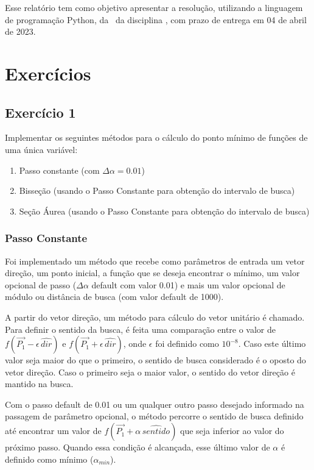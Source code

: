\documentclass[10pt, a4paper]{article}
\begin{document}
Esse relatório tem como objetivo apresentar a resolução, utilizando a linguagem de programação Python, da \TITLE \ da disciplina \DISCIPLINE, com prazo de entrega em 04 de abril de 2023.

\section{Exercícios}

\subsection{Exercício 1}

Implementar os seguintes métodos para o cálculo do ponto mínimo de funções de uma única variável:
\begin{enumerate}
  \item Passo constante (com $\Delta \alpha = 0.01$)
  \item Bisseção (usando o Passo Constante para obtenção do intervalo de busca)
  \item Seção Áurea (usando o Passo Constante para obtenção do intervalo de busca)
\end{enumerate}

\subsubsection{Passo Constante}

Foi implementado um método que recebe como parâmetros de entrada um vetor direção, um ponto inicial, 
a função que se deseja encontrar o mínimo, um valor opcional de passo ($\Delta\alpha$ default com valor 0.01)
e mais um valor opcional de módulo ou distância de busca (com valor default de 1000).

A partir do vetor direção, um método para cálculo do vetor unitário é chamado. Para definir o sentido da busca,
é feita uma comparação entre o valor de $f(\overrightarrow{P_1}-\epsilon\,\hat{dir})$ e $f(\overrightarrow{P_1}+\epsilon\,\hat{dir})$,
onde $\epsilon$ foi definido como $10^{-8}$.
Caso este último valor seja maior do que o primeiro, o sentido de busca considerado é o oposto do vetor direção. Caso o primeiro seja
o maior valor, o sentido do vetor direção é mantido na busca.

Com o passo default de 0.01 ou um qualquer outro passo desejado informado na passagem de parâmetro opcional, o método percorre o sentido
de busca definido até encontrar um valor de $f(\overrightarrow{P_1}+ \alpha\,\hat{sentido})$ que seja inferior ao valor do próximo passo.
Quando essa condição é alcançada, esse último valor de $\alpha$ é definido como mínimo ($\alpha_{min}$).
\end{document}
